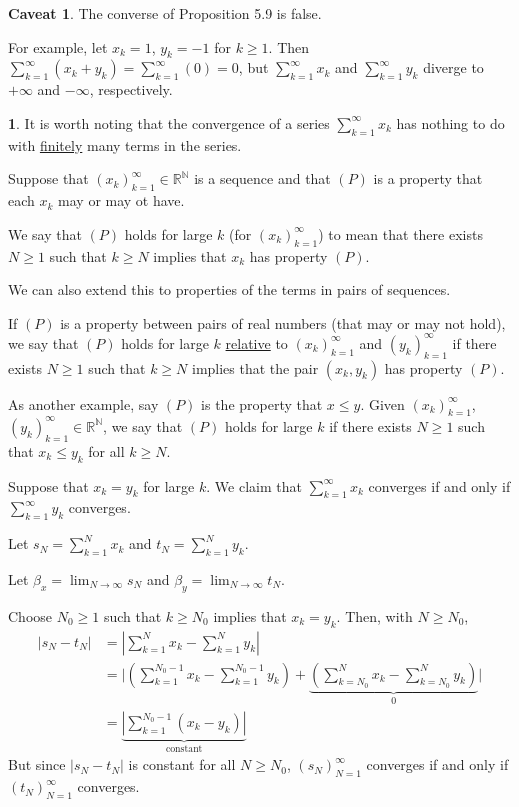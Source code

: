 \documentclass[11pt]{article}
\theoremstyle{definition}
\newtheorem{none}[thm]{}
\newtheorem{caveat}[thm]{Caveat}
\newcommand{\mbN}{\ensuremath{\mathbb{N}}}
\newcommand{\mbR}{\ensuremath{\mathbb{R}}}
\begin{document}
\begin{caveat}
The converse of Proposition 5.9 is false. 

For example, let $x_k = 1$, $y_k = -1$ for $k \geq 1$. 
Then $\sum_{k=1}^\infty (x_k + y_k) = \sum_{k=1}^\infty (0) = 0$, but $\sum_{k=1}^\infty x_k$ and $\sum_{k=1}^\infty y_k$ diverge to $+\infty$ and $-\infty$, respectively.
\end{caveat}

\begin{none}
It is worth noting that the convergence of a series $\sum_{k=1}^\infty x_k$ has nothing to do with \underline{finitely} many terms in the series. 

Suppose that $(x_k)_{k=1}^\infty \in \mbR^{\mbN}$ is a sequence and that $(P)$ is a property that each $x_k$ may or may ot have. 

We say that $(P)$ holds for large $k$ (for $(x_k)_{k=1}^\infty$) to mean that there exists $N \geq 1$ such that $k \geq N$ implies that $x_k$ has property $(P)$. 

We can also extend this to properties of the terms in pairs of sequences. 

If $(P)$ is a property between pairs of real numbers (that may or may not hold), we say that $(P)$ holds for large $k$ \underline{relative} to $(x_k)_{k=1}^\infty$ and $(y_k)_{k=1}^\infty$ if there exists $N \geq 1$ such that $k \geq N$ implies that the pair $(x_k, y_k)$ has property $(P)$. 

As another example, say $(P)$ is the property that $x \leq y$. Given $(x_k)_{k=1}^\infty$, $(y_k)_{k=1}^\infty \in \mbR^{\mbN}$, we say that $(P)$ holds for large $k$ if there exists $N \geq 1$ such that $x_k \leq y_k$ for all $k \geq N$. 

Suppose that $x_k = y_k$ for large $k$. We claim that $\sum_{k=1}^\infty x_k$ converges if and only if $\sum_{k=1}^\infty y_k$ converges. 

Let $s_N = \sum_{k=1}^N x_k$ and $t_N = \sum_{k=1}^N y_k$. 

Let $\beta_x = \lim_{N\to\infty} s_N$ and $\beta_y = \lim_{N\to\infty} t_N$. 

Choose $N_0 \geq 1$ such that $k \geq N_0$ implies that $x_k = y_k$. 
Then, with $N \geq N_0$, 
\begin{align*}
|s_N - t_N| 
& = \left|\sum_{k=1}^N x_k - \sum_{k=1}^N y_k\right| \\
& = \Bigg| \left(\sum_{k=1}^{N_0 - 1} x_k - \sum_{k=1}^{N_0 - 1} y_k \right) + \underbrace{\left(\sum_{k=N_0}^N x_k - \sum_{k=N_0}^N y_k\right)}_{0}\Bigg| \\
& =  \underbrace{\left|\sum_{k=1}^{N_0 - 1} (x_k - y_k)\right|}_{\text{constant}}
\end{align*}
But since $|s_N - t_N|$ is constant for all $N \geq N_0$, $(s_N)_{N=1}^\infty$ converges if and only if $(t_N)_{N=1}^\infty$ converges.
\end{none}
\end{document}
